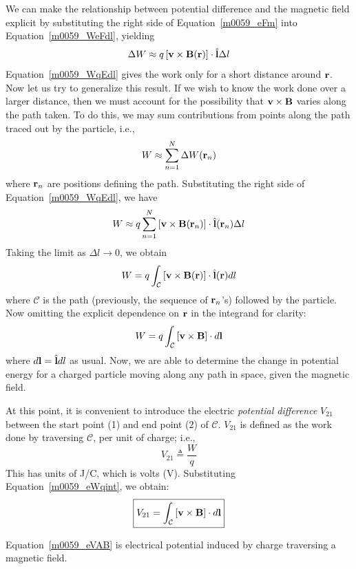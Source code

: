 We can make the relationship between potential difference and the magnetic field explicit by substituting the right side of Equation~\ref{m0059_eFm} into Equation~\ref{m0059_WeFdl}, yielding
%
\begin{equation}
\Delta W \approx q \left[ {\bf v} \times {\bf B}({\bf r})\right] \cdot\hat{\bf l}\Delta l
\label{m0059_WqEdl}
\end{equation}
%
Equation~\ref{m0059_WqEdl} gives the work only for a short distance around ${\bf r}$.  
Now let us try to generalize this result.
If we wish to know the work done over a larger distance, then we must account for the possibility that ${\bf v} \times {\bf B}$ varies along the path taken.
To do this, we may sum contributions from points along the path traced out by the particle, i.e.,
%
\begin{equation}
W \approx \sum_{n=1}^N \Delta W ({\bf r}_n) 
\end{equation}
%
where ${\bf r}_n$ are positions defining the path.  Substituting the right side of Equation~\ref{m0059_WqEdl}, we have 
%
\begin{equation}
W \approx q \sum_{n=1}^N \left[ {\bf v} \times {\bf B}({\bf r}_n) \right] \cdot\hat{\bf l}({\bf r}_n)\Delta l
\end{equation}
%
Taking the limit as $\Delta l\to 0$, we obtain
%
\begin{equation}
W = q \int_{\mathcal C} \left[ {\bf v} \times {\bf B}({\bf r}) \right] \cdot\hat{\bf l}({\bf r}) dl
\end{equation}
%
where $\mathcal{C}$ is the path (previously, the sequence of ${\bf r}_n$'s) followed by the particle.
Now omitting the explicit dependence on ${\bf r}$ in the integrand for clarity:
%
\begin{equation}
W = q \int_{\mathcal C} \left[ {\bf v} \times {\bf B} \right] \cdot d{\bf l}
\label{m0059_eWqint}
\end{equation}
%
where $d{\bf l} = \hat{\bf l}dl$ as usual.
Now, we are able to determine the change in potential energy for a charged particle moving along any path in space, given the magnetic field.

At this point, it is convenient to introduce the electric {\it potential difference} $V_{21}$ 
between the start point (1) and end point (2) of ${\mathcal C}$.  $V_{21}$ is defined as the work done by traversing ${\mathcal C}$, per unit of charge; i.e.,
%
\begin{equation}
V_{21} \triangleq \frac{W}{q} 
\end{equation}
%
This has units of J/C, which is volts (V). Substituting Equation~\ref{m0059_eWqint}, we obtain:
%
\begin{equation}
\boxed{
V_{21} = \int_{\mathcal C} \left[ {\bf v} \times {\bf B} \right] \cdot d{\bf l}
}
\label{m0059_eVAB}
\end{equation}
%
\begin{mdframed}[backgroundcolor=yellow!20,nobreak=true] 
Equation~\ref{m0059_eVAB} is electrical potential induced by charge traversing a magnetic field.
\end{mdframed}

